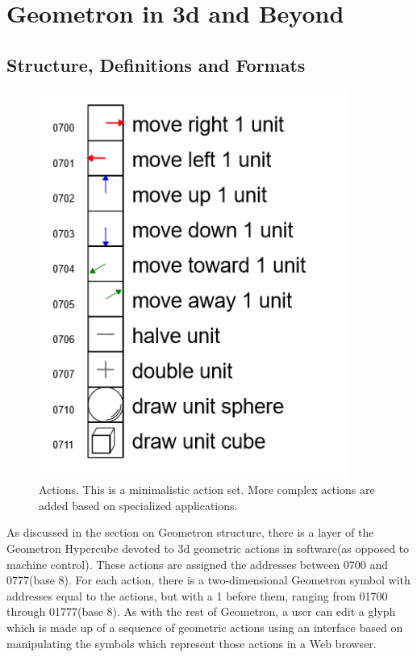 
\section{Geometron in 3d and Beyond}

\subsection{Structure, Definitions and Formats}


\begin{figure}
	\centering
	\includegraphics[width=4in]{figures/geometron3d/actions.png}
	\caption[actions3d]
	{Actions.  This is a minimalistic action set. More complex actions are added based on specialized applications.}
\end{figure}


As discussed in the section on Geometron structure, there is a layer of the Geometron Hypercube devoted to 3d geometric actions in software(as opposed to machine control).  These actions are assigned the addresses between 0700 and 0777(base 8).  For each action, there is a two-dimensional Geometron symbol with addresses equal to the actions, but with a 1 before them, ranging from 01700 through 01777(base 8).  As with the rest of Geometron, a user can edit a glyph which is made up of a sequence of geometric actions using an interface based on manipulating the symbols which represent those actions in a Web browser.

